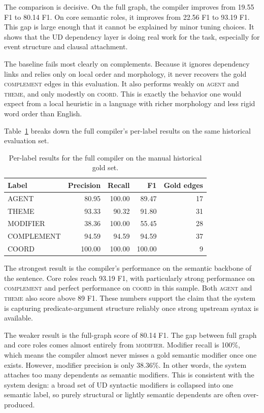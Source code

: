 \documentclass[11pt]{article}
\begin{document}
The comparison is decisive. On the full graph, the compiler improves from 19.55 F1
to 80.14 F1. On core semantic roles, it improves from 22.56 F1 to 93.19 F1.
This gap is large enough that it cannot be explained by minor tuning choices. It
shows that the UD dependency layer is doing real work for the task, especially
for event structure and clausal attachment.

The baseline fails most clearly on complements. Because it ignores dependency
links and relies only on local order and morphology, it never recovers the gold
\textsc{complement} edges in this evaluation. It also performs weakly on
\textsc{agent} and \textsc{theme}, and only modestly on \textsc{coord}. This is
exactly the behavior one would expect from a local heuristic in a language with
richer morphology and less rigid word order than English.

Table~\ref{tab:label-results} breaks down the full compiler's per-label results
on the same historical evaluation set.

\begin{table}[t]
\centering
\caption{Per-label results for the full compiler on the manual historical gold
set.}
\label{tab:label-results}
\begin{tabular}{lrrrr}
\toprule
Label & Precision & Recall & F1 & Gold edges \\
\midrule
AGENT & 80.95 & 100.00 & 89.47 & 17 \\
THEME & 93.33 & 90.32 & 91.80 & 31 \\
MODIFIER & 38.36 & 100.00 & 55.45 & 28 \\
COMPLEMENT & 94.59 & 94.59 & 94.59 & 37 \\
COORD & 100.00 & 100.00 & 100.00 & 9 \\
\bottomrule
\end{tabular}
\end{table}

The strongest result is the compiler's performance on the semantic backbone of
the sentence. Core roles reach 93.19 F1, with particularly strong performance on
\textsc{complement} and perfect performance on \textsc{coord} in this sample.
Both \textsc{agent} and \textsc{theme} also score above 89 F1. These numbers
support the claim that the system is capturing predicate-argument structure
reliably once strong upstream syntax is available.

The weaker result is the full-graph score of 80.14 F1. The gap between full
graph and core roles comes almost entirely from \textsc{modifier}. Modifier
recall is 100\%, which means the compiler almost never misses a gold semantic
modifier once one exists. However, modifier precision is only 38.36\%. In other
words, the system attaches too many dependents as semantic modifiers. This is
consistent with the system design: a broad set of UD syntactic modifiers is
collapsed into one semantic label, so purely structural or lightly semantic
dependents are often over-produced.
\end{document}
